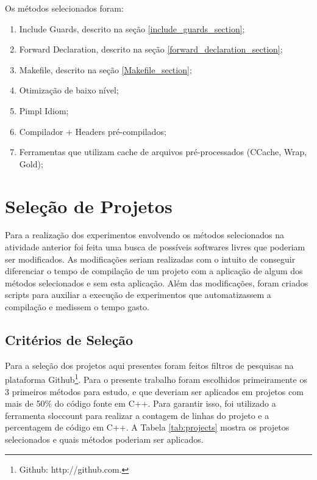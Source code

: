 Os métodos selecionados foram:

\begin{enumerate}
	\item Include Guards, descrito na seção
 \ref{include_guards_section};
	\item Forward Declaration, descrito na seção
 \ref{forward_declaration_section};
	\item Makefile, descrito na seção
 \ref{Makefile_section};
	\item Otimização de baixo nível;
	\item Pimpl Idiom;
	\item Compilador + Headers pré-compilados;
	\item Ferramentas que utilizam cache de arquivos 
pré-processados (CCache, Wrap, Gold);
\end{enumerate}

\section{Seleção de Projetos}

Para a realização dos experimentos  envolvendo os métodos selecionados na
 atividade anterior foi feita uma busca de possíveis softwares livres que
 poderiam ser modificados.  As modificações seriam realizadas com o intuito
 de conseguir diferenciar o tempo de compilação de um projeto com a aplicação
 de algum dos métodos selecionados e sem  esta aplicação. Além das
 modificações, foram criados scripts para auxiliar a execução de experimentos
 que automatizassem a compilação e medissem o tempo gasto.

\subsection{Critérios de Seleção}


Para a seleção dos projetos aqui presentes foram feitos filtros de pesquisas
 na plataforma Github\footnote{Github: http://github.com.}. Para o presente
 trabalho foram escolhidos primeiramente os 3 primeiros métodos para estudo,
 e que deveriam ser aplicados em projetos com mais de 50\% do código fonte em
 C++. Para garantir isso, foi utilizado a ferramenta sloccount para realizar
 a contagem de linhas do projeto e a percentagem de código em C++.
 A Tabela \ref{tab:projects} mostra os projetos selecionados e quais métodos
 poderiam ser aplicados.

